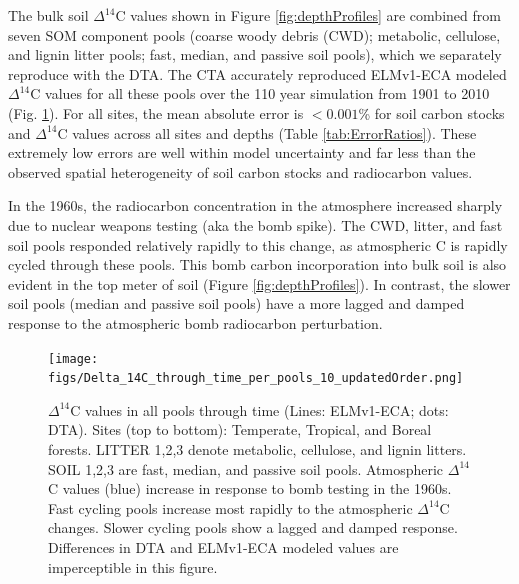 \documentclass[11pt,a4paper]{article}
\begin{document}
The bulk soil $\Delta^{14}$C values shown in Figure \ref{fig:depthProfiles} are combined from seven SOM component pools (coarse woody debris (CWD); metabolic, cellulose, and lignin litter pools; fast, median, and passive soil pools), which we separately reproduce with the DTA. The CTA accurately reproduced ELMv1-ECA modeled $\Delta^{14}$C values for all these pools over the 110 year simulation from 1901 to 2010 (Fig. \ref{fig:poolsOverTime}). For all sites, the mean absolute error is $<0.001$\% for soil carbon stocks and $\Delta^{14}$C values across all sites and depths (Table \ref{tab:ErrorRatios}). These extremely low errors are well within model uncertainty and far less than the observed spatial heterogeneity of soil carbon stocks and radiocarbon values. 

In the 1960s, the radiocarbon concentration in the atmosphere increased sharply due to nuclear weapons testing (aka the bomb spike). The CWD, litter, and fast soil pools responded relatively rapidly to this change, as atmospheric C is rapidly cycled through these pools. This bomb carbon incorporation into bulk soil is also evident in the top meter of soil (Figure \ref{fig:depthProfiles}). In contrast, the slower soil pools (median and passive soil pools) have a more lagged and damped response to the atmospheric bomb radiocarbon perturbation.

\begin{figure}[htbp]
        \centering 
        \vspace{-8em}
        \texttt{[image: figs/Delta\_14C\_through\_time\_per\_pools\_10\_updatedOrder.png]}
        \vspace{-4em}
        \caption{$\Delta^{14}$C values in all pools through time (Lines: ELMv1-ECA; dots: DTA). Sites (top to bottom): Temperate, Tropical, and Boreal forests. LITTER 1,2,3 denote metabolic, cellulose, and lignin litters. SOIL 1,2,3 are fast, median, and passive soil pools. Atmospheric $\Delta^{14}$C values (blue) increase in response to bomb testing in the 1960s. Fast cycling pools increase most rapidly to the atmospheric $\Delta^{14}$C changes. Slower cycling pools show a lagged and damped response. Differences in DTA and ELMv1-ECA modeled values are imperceptible in this figure.
        \label{fig:poolsOverTime}
        }
    \end{figure}    
    
    
\end{document}
